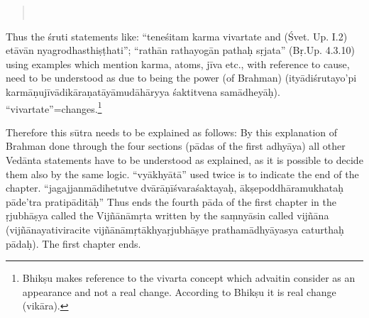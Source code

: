 \begin{verse}
\\
\end{verse}



Thus the śruti statements like: “teneśitam karma vivartate and (Śvet. Up. I.2) etāvān nyagrodhasthiṣṭhati”; “rathān rathayogān pathaḥ sṛjata” (Bṛ.Up. 4.3.10) using examples which mention karma, atoms, jīva etc., with reference to cause, need to be understood as due to being the power (of Brahman) (ityādiśrutayo’pi karmāṇujīvādikāraṇatāyāmudāhāryya śaktitvena samādheyāḥ). “vivartate”=changes.\footnote{Bhikṣu makes reference to the vivarta concept which advaitin consider as an appearance and not a real change. According to Bhikṣu it is real change (vikāra).} 

Therefore this sūtra needs to be explained as follows: By this explanation of Brahman done through the four sections (pādas of the first adhyāya) all other Vedānta statements have to be understood as   explained, as it is possible to decide them also by the same logic. “vyā\-khyātā” used twice is to indicate the end of the chapter. “jagajjanmādihetutve dvārāṇīśvaraśaktayaḥ, ākṣepoddhāramukhataḥ pāde’tra pratipāditāḥ” Thus ends the fourth pāda of the first chapter in the ṛjubhāṣya called the Vijñānāmṛta written by the saṃnyāsin called vijñāna (vijñānayativiracite vijñānāmṛtākhyaṛjubhāṣye prathamādhyā\-yasya caturthaḥ pādaḥ). The first chapter ends.
